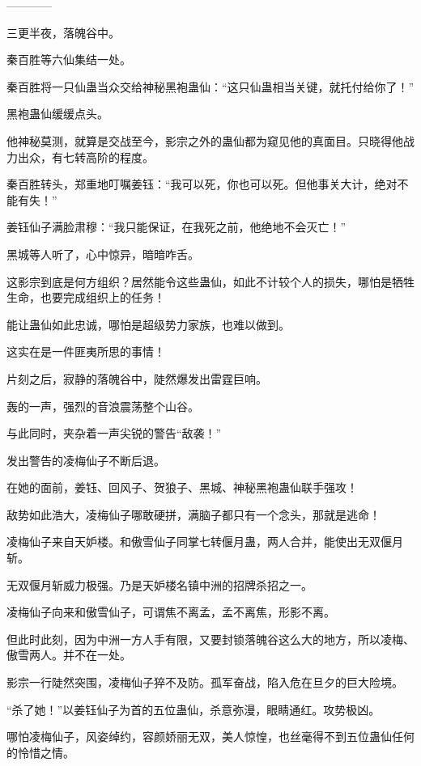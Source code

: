 
\begin{this_body}

------------

三更半夜，落魄谷中。

秦百胜等六仙集结一处。

秦百胜将一只仙蛊当众交给神秘黑袍蛊仙：“这只仙蛊相当关键，就托付给你了！”

黑袍蛊仙缓缓点头。

他神秘莫测，就算是交战至今，影宗之外的蛊仙都为窥见他的真面目。只晓得他战力出众，有七转高阶的程度。

秦百胜转头，郑重地叮嘱姜钰：“我可以死，你也可以死。但他事关大计，绝对不能有失！”

姜钰仙子满脸肃穆：“我只能保证，在我死之前，他绝地不会灭亡！”

黑城等人听了，心中惊异，暗暗咋舌。

这影宗到底是何方组织？居然能令这些蛊仙，如此不计较个人的损失，哪怕是牺牲生命，也要完成组织上的任务！

能让蛊仙如此忠诚，哪怕是超级势力家族，也难以做到。

这实在是一件匪夷所思的事情！

片刻之后，寂静的落魄谷中，陡然爆发出雷霆巨响。

轰的一声，强烈的音浪震荡整个山谷。

与此同时，夹杂着一声尖锐的警告“敌袭！”

发出警告的凌梅仙子不断后退。

在她的面前，姜钰、回风子、贺狼子、黑城、神秘黑袍蛊仙联手强攻！

敌势如此浩大，凌梅仙子哪敢硬拼，满脑子都只有一个念头，那就是逃命！

凌梅仙子来自天妒楼。和傲雪仙子同掌七转偃月蛊，两人合并，能使出无双偃月斩。

无双偃月斩威力极强。乃是天妒楼名镇中洲的招牌杀招之一。

凌梅仙子向来和傲雪仙子，可谓焦不离孟，孟不离焦，形影不离。

但此时此刻，因为中洲一方人手有限，又要封锁落魄谷这么大的地方，所以凌梅、傲雪两人。并不在一处。

影宗一行陡然突围，凌梅仙子猝不及防。孤军奋战，陷入危在旦夕的巨大险境。

“杀了她！”以姜钰仙子为首的五位蛊仙，杀意弥漫，眼睛通红。攻势极凶。

哪怕凌梅仙子，风姿绰约，容颜娇丽无双，美人惊惶，也丝毫得不到五位蛊仙任何的怜惜之情。


\end{this_body}
